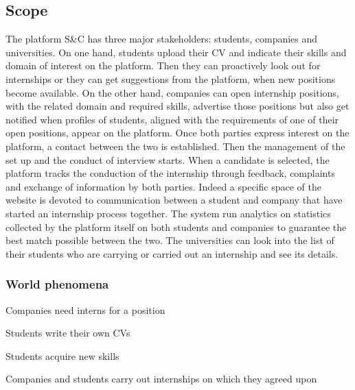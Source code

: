 \subsection{Scope}
    The platform S\&C has three major stakeholders: students, companies and universities. On one hand, students upload their CV and indicate their skills and domain of interest on the platform. Then they can proactively look out for internships or they can get suggestions from the platform, when new positions become available. On the other hand, companies can open internship positions, with the related domain and required skills, advertise those positions but also get notified when profiles of students, aligned with the requirements of one of their open positions, appear on the platform.
    Once both parties express interest on the platform, a contact between the two is established. Then the management of the set up and the conduct of interview starts. When a candidate is selected, the platform tracks the conduction of the internship through feedback, complaints and exchange of information by both parties. Indeed a specific space of the website is devoted to communication between a student and company that have started an internship process together. The system run analytics on statistics collected by the platform itself on both students and companies to guarantee the best match possible between the two.
    The universities can look into the list of their students who are carrying or carried out an internship and see its details.

    \newpage
    \subsubsection{World phenomena}
        \begin{enumerate}[label={[WP\arabic*]}]
            \item {Companies need interns for a position}
            \item {Students write their own CVs}
            \item {Students acquire new skills }
            \item {Companies and students carry out internships on which they agreed upon}
        \end{enumerate}

    

